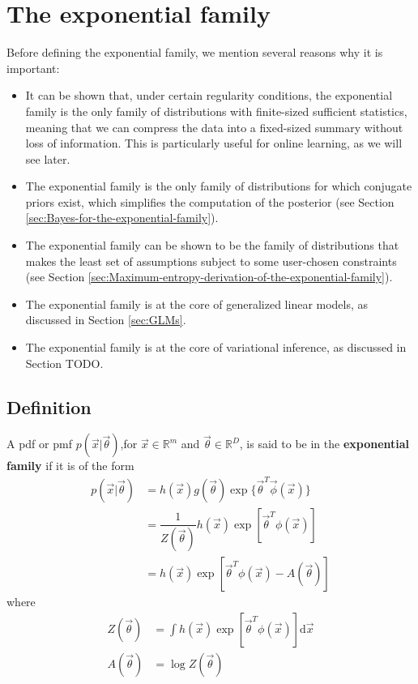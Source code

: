 \section{The exponential family}
\label{sec:exponential-family}

Before defining the exponential family, we mention several reasons why it is important:
\begin{itemize}
	\item{It can be shown that, under certain regularity conditions, the exponential family is the only family of distributions with finite-sized sufficient statistics, meaning that we can compress the data into a fixed-sized summary without loss of information. This is particularly useful for online learning, as we will see later.}
	\item{The exponential family is the only family of distributions for which conjugate priors exist, which simplifies the computation of the posterior (see Section \ref{sec:Bayes-for-the-exponential-family}).}
	\item{The exponential family can be shown to be the family of distributions that makes the least set of assumptions subject to some user-chosen constraints (see Section \ref{sec:Maximum-entropy-derivation-of-the-exponential-family}).}
	\item{The exponential family is at the core of generalized linear models, as discussed in Section \ref{sec:GLMs}.}
	\item{The exponential family is at the core of variational inference, as discussed in Section TODO.}
\end{itemize}


\subsection{Definition}
A pdf or pmf $p(\vec{x}|\vec{\theta})$,for $\vec{x} \in \mathbb{R}^m$ and $\vec{\theta} \in \mathbb{R}^D$, is said to be in the \textbf{exponential family} if it is of the form
\begin{align}
p(\vec{x}|\vec{\theta}) 
&= h(\vec{x})g(\vec{\theta})\exp\{\vec{\theta}^T\vec{\phi}(\vec{x})\} \\
&=\dfrac{1}{Z(\vec{\theta})}h(\vec{x})\exp[\vec{\theta}^T\phi(\vec{x})] \\
& = h(\vec{x})\exp[\vec{\theta}^T\phi(\vec{x})-A(\vec{\theta})] \label{eqn:exponential-family}
\end{align}
where
\begin{align}
Z(\vec{\theta}) & =\int h(\vec{x})\exp[\vec{\theta}^T\phi(\vec{x})]\mathrm{d}\vec{x} \\
A(\vec{\theta}) & =\log Z(\vec{\theta})
\end{align}

